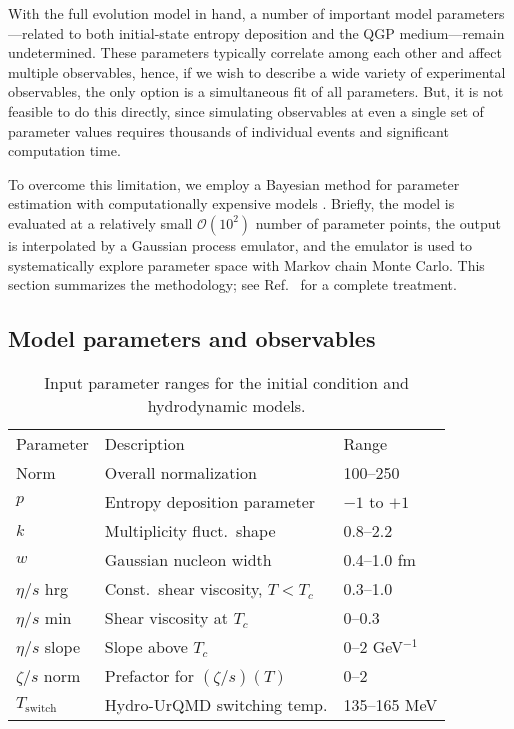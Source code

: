 \documentclass[aps,prc,reprint,amsmath,nofootinbib,superscriptaddress]{revtex4-1}
\newcommand{\paddedhline}{\noalign{\smallskip}\hline\noalign{\smallskip}}
\newcommand{\order}[1]{$\mathcal O(10^{#1})$}
\begin{document}
With the full evolution model in hand, a number of important model parameters---related to both initial-state entropy deposition and the QGP medium---remain undetermined.
These parameters typically correlate among each other and affect multiple observables, hence, if we wish to describe a wide variety of experimental observables, the only option is a simultaneous fit of all parameters.
But, it is not feasible to do this directly, since simulating observables at even a single set of parameter values requires thousands of individual events and significant computation time.

To overcome this limitation, we employ a Bayesian method for parameter estimation with computationally expensive models \cite{OHagan:2006ba,Higdon:2008cmc,Higdon:2014tva,Wesolowski:2015fqa}.
Briefly, the model is evaluated at a relatively small \order 2 number of parameter points, the output is interpolated by a Gaussian process emulator, and the emulator is used to systematically explore parameter space with Markov chain Monte Carlo.
This section summarizes the methodology; see Ref.~\cite{Bernhard:2015hxa} for a complete treatment.

\subsection{Model parameters and observables}

\begin{table}
  \caption{
    \label{tab:design}
    Input parameter ranges for the initial condition and hydrodynamic models.
  }
  \begin{ruledtabular}
  \begin{tabular}{lll}
    Parameter         & Description                        & Range           \\
    \paddedhline
    Norm              & Overall normalization              & 100--250        \\
    $p$               & Entropy deposition parameter       & $-1$ to $+1$    \\
    $k$               & Multiplicity fluct.\ shape         & 0.8--2.2        \\
    $w$               & Gaussian nucleon width             & 0.4--1.0 fm     \\
    $\eta/s$ hrg      & Const.\ shear viscosity, $T < T_c$ & 0.3--1.0        \\
    $\eta/s$ min      & Shear viscosity at $T_c$           & 0--0.3          \\
    $\eta/s$ slope    & Slope above $T_c$                  & 0--2 GeV$^{-1}$ \\
    $\zeta/s$ norm    & Prefactor for $(\zeta/s)(T)$       & 0--2            \\
    $T_\text{switch}$ & Hydro-UrQMD switching temp.        & 135--165 MeV    \\
  \end{tabular}
  \end{ruledtabular}
\end{table}
\end{document}
